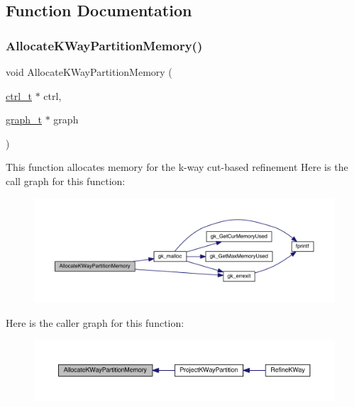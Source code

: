 \subsection{Function Documentation}
\mbox{\label{a00915_a22a23a687ef7ed0d4f66ab58e3a81d12}} 
\subsubsection{\texorpdfstring{Allocate\+K\+Way\+Partition\+Memory()}{AllocateKWayPartitionMemory()}}
{\footnotesize\ttfamily void Allocate\+K\+Way\+Partition\+Memory (\begin{DoxyParamCaption}\item[{\hyperlink{a00742}{ctrl\+\_\+t} $\ast$}]{ctrl,  }\item[{\hyperlink{a00734}{graph\+\_\+t} $\ast$}]{graph }\end{DoxyParamCaption})}

This function allocates memory for the k-\/way cut-\/based refinement Here is the call graph for this function\+:\nopagebreak
\begin{figure}[H]
\begin{center}
\leavevmode
\includegraphics[width=350pt]{a00915_a22a23a687ef7ed0d4f66ab58e3a81d12_cgraph}
\end{center}
\end{figure}
Here is the caller graph for this function\+:\nopagebreak
\begin{figure}[H]
\begin{center}
\leavevmode
\includegraphics[width=350pt]{a00915_a22a23a687ef7ed0d4f66ab58e3a81d12_icgraph}
\end{center}
\end{figure}
\mbox{\label{a00915_aa23b4d433fc175282f237653d3edb8a5}} 
